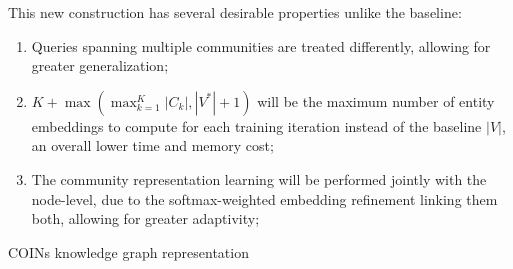 This new construction has several desirable properties unlike the baseline: 
\begin{enumerate}
    \item Queries spanning multiple communities are treated differently, allowing for greater generalization; 
    \item $K + \max{(\max_{k=1}^{K}{|C_k|},|V^{*}| + 1)}$ will be the maximum number of entity embeddings to compute for each training iteration instead of the baseline $|V|$, an overall lower time and memory cost;
    \item The community representation learning will be performed jointly with the node-level, due to the softmax-weighted embedding refinement linking them both, allowing for greater adaptivity;
\end{enumerate}

\begin{algorithm}[H]
\caption{COINs knowledge graph representation}
\label{algorithm:coins}
\begin{algorithmic}[1]
\ELSE
{}
\ENDIF
{}
\end{algorithmic}
\end{algorithm} 

